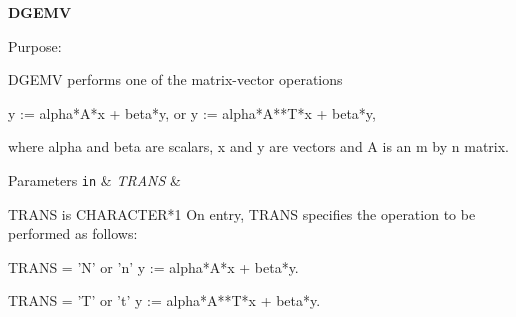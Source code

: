 {\bfseries D\+G\+E\+M\+V} 

\begin{DoxyParagraph}{Purpose\+: }
\begin{DoxyVerb} DGEMV  performs one of the matrix-vector operations

    y := alpha*A*x + beta*y,   or   y := alpha*A**T*x + beta*y,

 where alpha and beta are scalars, x and y are vectors and A is an
 m by n matrix.\end{DoxyVerb}
 
\end{DoxyParagraph}

\begin{DoxyParams}[1]{Parameters}
\mbox{\tt in}  & {\em T\+R\+A\+N\+S} & \begin{DoxyVerb}          TRANS is CHARACTER*1
           On entry, TRANS specifies the operation to be performed as
           follows:

              TRANS = 'N' or 'n'   y := alpha*A*x + beta*y.

              TRANS = 'T' or 't'   y := alpha*A**T*x + beta*y.


\end{DoxyVerb}
\end{DoxyParams}
